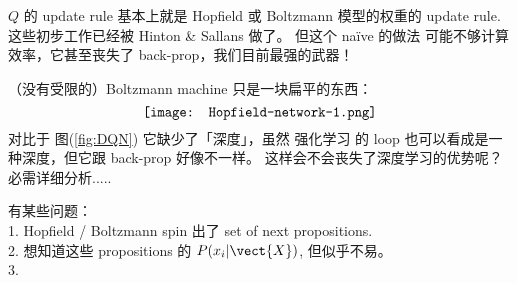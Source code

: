 \begin{preview}
\begin{minipage}{\textwidth}
$Q$ 的 update rule 基本上就是 Hopfield 或 Boltzmann 模型的权重的 update rule.  这些初步工作已经被 Hinton \& Sallans 做了。 但这个 na\"{i}ve 的做法 可能不够计算效率，它甚至丧失了 back-prop，我们目前最强的武器！

（没有受限的）Boltzmann machine 只是一块扁平的东西：
\begin{equation}
\vcenter{\hbox{\texttt{[image: Hopfield-network-1.png]}}}
\end{equation}
对比于 图(\ref{fig:DQN}) 它缺少了「深度」，虽然 强化学习 的 loop 也可以看成是一种深度，但它跟 back-prop 好像不一样。 这样会不会丧失了深度学习的优势呢？ 必需详细分析.....

有某些问题： \\
1. Hopfield / Boltzmann spin 出了 set of next propositions. \\
2. 想知道这些 propositions 的 $P(x_i | \vect{X})$, 但似乎不易。 \\
3. 

\printbibliography

\end{minipage}
\end{preview}


